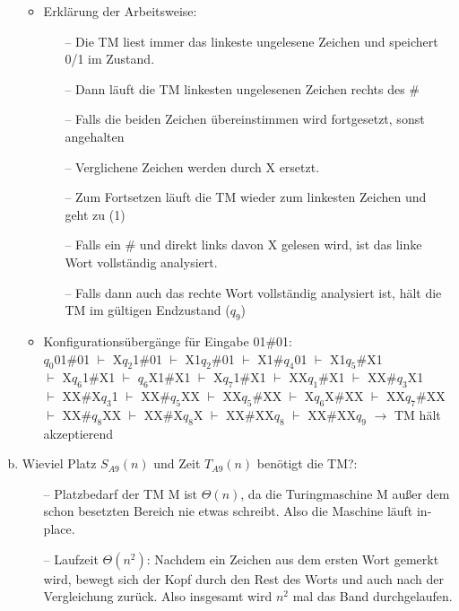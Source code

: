 \documentclass[11pt]{article}
\begin{document}
\begin{enumerate}[(a)]
\begin{itemize}
        \item Erklärung der Arbeitsweise:
        \begin{itemize}
            \item[--] Die TM liest immer das linkeste ungelesene Zeichen und speichert 0/1 im Zustand.
            \item[--] Dann läuft die TM linkesten ungelesenen Zeichen rechts des \#
            \item[--] Falls die beiden Zeichen übereinstimmen wird fortgesetzt, sonst angehalten
            \item[--] Verglichene Zeichen werden durch X ersetzt.
            \item[--] Zum Fortsetzen läuft die TM wieder zum linkesten Zeichen und geht zu (1)
            \item[--] Falls ein \# und direkt links davon X gelesen wird, ist das linke Wort vollständig analysiert.
            \item[--] Falls dann auch das rechte Wort vollständig analysiert ist, hält die TM im gültigen Endzustand ($q_9$)   
        \end{itemize}
        
        \bigbreak
        \item Konfigurationsübergänge für Eingabe 01\#01:\\
        $q_0$01\#01 $\vdash$ X$q_2$1\#01 $\vdash$ X1$q_2$\#01 $\vdash$ X1\#$q_4$01 $\vdash$ X1$q_5$\#X1 
        \\ $\vdash$ X$q_6$1\#X1 $\vdash$ $q_6$X1\#X1 $\vdash$ X$q_7$1\#X1 $\vdash$ XX$q_1$\#X1 $\vdash$ XX\#$q_3$X1 
        \\ $\vdash$ XX\#X$q_3$1 $\vdash$ XX\#$q_5$XX $\vdash$ XX$q_5$\#XX $\vdash$ X$q_6$X\#XX $\vdash$ XX$q_7$\#XX 
        \\ $\vdash$ XX\#$q_8$XX $\vdash$ XX\#X$q_8$X $\vdash$ XX\#XX$q_8$ $\vdash$ XX\#XX$q_9$ $\rightarrow$ TM hält akzeptierend
    \end{itemize}
    
    \item Wieviel Platz $S_{A9}(n)$ und Zeit $T_{A9}(n)$ benötigt die TM?:
    \begin{itemize}
        \item[--] Platzbedarf der TM M ist $\Theta(n)$, da die Turingmaschine M außer dem schon besetzten Bereich nie etwas schreibt. Also die Maschine läuft \glqq in-place\grqq.
        \item[--] Laufzeit $\Theta(n^2)$: Nachdem ein Zeichen aus dem ersten Wort gemerkt wird, bewegt sich der Kopf durch den Rest des Worts und auch nach der Vergleichung zurück. Also insgesamt wird $n^2$ mal das Band durchgelaufen.
    \end{itemize}
    
\end{enumerate}
\end{document}
